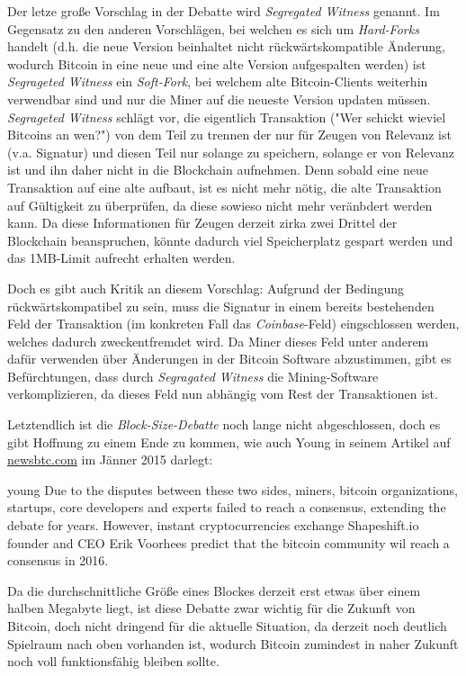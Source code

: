 Der letze große Vorschlag in der Debatte wird \emph{Segregated Witness} genannt.
Im Gegensatz zu den anderen Vorschlägen, bei welchen es sich um \emph{Hard-Forks} handelt (d.h. die neue Version beinhaltet nicht rückwärtskompatible Änderung, wodurch Bitcoin in eine neue und eine alte Version aufgespalten werden) ist \emph{Segrageted Witness} ein \emph{Soft-Fork}, bei welchem alte Bitcoin-Clients weiterhin verwendbar sind und nur die Miner auf die neueste Version updaten müssen.
\emph{Segrageted Witness} schlägt vor, die eigentlich Transaktion ("Wer schickt wieviel Bitcoins an wen?") von dem Teil zu trennen der nur für Zeugen von Relevanz ist (v.a. Signatur) und diesen Teil nur solange zu speichern, solange er von Relevanz ist und ihn daher nicht in die Blockchain aufnehmen.
Denn sobald eine neue Transaktion auf eine alte aufbaut, ist es nicht mehr nötig, die alte Transaktion auf Gültigkeit zu überprüfen, da diese sowieso nicht mehr veränbdert werden kann.
Da diese Informationen für Zeugen derzeit zirka zwei Drittel der Blockchain beanspruchen, könnte dadurch viel Speicherplatz gespart werden und das 1MB-Limit aufrecht erhalten werden.

Doch es gibt auch Kritik an diesem Vorschlag:
Aufgrund der Bedingung rückwärtskompatibel zu sein, muss die Signatur in einem bereits bestehenden Feld der Transaktion (im konkreten Fall das \emph{Coinbase}-Feld) eingschlossen werden, welches dadurch zweckentfremdet wird.
Da Miner dieses Feld unter anderem dafür verwenden über Änderungen in der Bitcoin Software abzustimmen, gibt es Befürchtungen, dass durch \emph{Segragated Witness} die Mining-Software verkomplizieren, da dieses Feld nun abhängig vom Rest der Transaktionen ist.

Letztendlich ist die \emph{Block-Size-Debatte} noch lange nicht abgeschlossen, doch es gibt Hoffnung zu einem Ende zu kommen, wie auch Young in seinem Artikel auf \url{newsbtc.com} im Jänner 2015 darlegt:

\begin{longquote}{young}
Due to the disputes between these two sides, miners, bitcoin organizations, startups, core developers and experts failed to reach a consensus, extending the debate for years.
However, instant cryptocurrencies exchange Shapeshift.io founder and CEO Erik Voorhees predict that the bitcoin community wil reach a consensus in 2016.
\end{longquote}

Da die durchschnittliche Größe eines Blockes derzeit erst etwas über einem halben Megabyte liegt, ist diese Debatte zwar wichtig für die Zukunft von Bitcoin, doch nicht dringend für die aktuelle Situation, da derzeit noch deutlich Spielraum nach oben vorhanden ist, wodurch Bitcoin zumindest in naher Zukunft noch voll funktionsfähig bleiben sollte.
